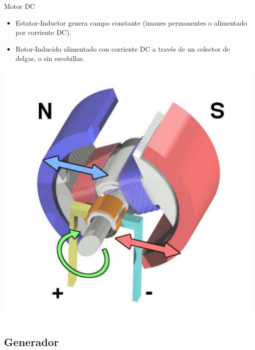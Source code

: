 \documentclass[xcolor={usenames,svgnames,dvipsnames}]{beamer}
\begin{document}
\begin{frame}[label={sec:org6e50b79}]{Motor DC}
\begin{itemize}
\item \alert{Estator-Inductor} genera \alert{campo constante} (imanes permanentes o alimentado por corriente DC).

\item \alert{Rotor-Inducido} alimentado con \alert{corriente DC} a través de un colector de delgas, o sin escobillas.
\end{itemize}

\begin{center}
\includegraphics[height=0.6\textheight]{../figs/Electric_motor_cycle_3.pdf}
\end{center}
\end{frame}


\subsection{Generador}
\label{sec:orgc8917e4}
\end{document}
